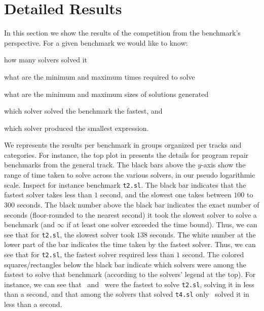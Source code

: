\section{Detailed Results}
\label{sec:benchs-pres}

In this section we show the results of the competition from the benchmark's perspective.
For a given benchmark we would like to know:
\begin{inlist}
	\item how many solvers solved it
	\item what are the minimum and maximum times required to solve
	\item what are the minimum and maximum sizes of solutions generated
	\item which solver solved the benchmark the fastest, and
	\item which solver produced the smallest expression.
\end{inlist}

We represents the results per benchmark in groups organized per tracks and categories.
For instance, the top plot in  presents the details for program repair benchmarks from the general track.
The black bars above the $y$-axis show the range of time taken to solve across the various solvers, in our pseudo logarithmic scale.
Inspect for instance benchmark \texttt{t2.sl}.
The black bar indicates that the fastest solver takes less than $1$ second, and the slowest one takes between $100$ to $300$ seconds.
The black number above the black bar indicates the exact number of seconds (floor-rounded to the nearest second)
it took the slowest solver to solve a benchmark (and $\infty$ if at least one solver exceeded the time bound).
Thus, we can see that for \texttt{t2.sl}, the slowest solver took $138$ seconds.
The white number at the lower part of the bar indicates the time taken by the fastest solver.
Thus, we can see that for \texttt{t2.sl}, the fastest solver required less than $1$ second.
The colored squares/rectangles below the black bar indicate which solvers were among the fastest to solve that benchmark
(according to the solvers' legend at the top).
For instance, we can see that \cvcnew\ and \eusolvernew\ were the fastest to solve \texttt{t2.sl},
solving it in less than a second, and that among the solvers that solved \texttt{t4.sl} only \eusolvernew\ solved it in less than a second.


